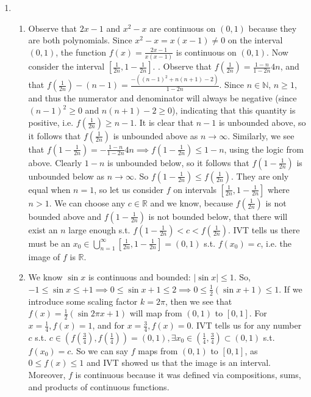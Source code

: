 \documentclass{article}
\begin{document}
\begin{enumerate}
    \item {}
    \begin{enumerate}
      \item Observe that $2x-1$ and $x^2 - x$ are continuous on $(0, 1)$ because
      they are both polynomials. Since $x^2 - x = x(x-1) \neq 0$
      on the interval $(0, 1)$, the function $f(x) = \frac{2x-1}{x(x-1)}$
      is continuous on $(0, 1)$.
      Now consider the interval $[\frac{1}{2n}, 1-\frac{1}{2n}]$.
      .
      Observe that $f(\frac{1}{2n}) = \frac{1 - n}{1-2n}4n$,
      and that $f(\frac{1}{2n}) - (n-1) = \frac{-((n-1)^2 + n(n+1) - 2)}{1-2n}$.
      Since $n\in\mathbb{N}$, $n\geq 1$, and thus the numerator 
      and denominator will always be negative (since $(n-1)^2 \geq 0$ and 
      $n(n+1) - 2 \geq 0$), indicating that this quantity is positive,
      i.e. $f(\frac{1}{2n}) \geq n-1$. It is clear that $n-1$
      is unbounded above, so it follows that $f(\frac{1}{2n})$ 
      is unbounded above as $n\to\infty$.
      Similarly,
      we see that $f(1-\frac{1}{2n}) = -\frac{1-n}{1-2n}4n
      \implies f(1-\frac{1}{2n}) \leq 1-n$, using 
      the logic from above. Clearly $1-n$ 
      is unbounded below,
      so it follows that $f(1-\frac{1}{2n})$
      is unbounded below as $n\to\infty$.
      So $f(1-\frac{1}{2n})\leq f(\frac{1}{2n})$.
      They are only equal when $n=1$,
      so let us consider $f$ on
      intervals $[\frac{1}{2n}, 1-\frac{1}{2n}]$
      where $n>1$.
      We can choose any $c\in\mathbb{R}$
      and we know, because 
      $f(\frac{1}{2n})$ is 
      not bounded above
      and $f(1-\frac{1}{2n})$
      is not bounded below,
      that there will exist an $n$ large enough
      s.t. $f(1-\frac{1}{2n}) < c < f(\frac{1}{2n})$.
      IVT tells us there must be an $x_0\in
      \bigcup\limits_{n=1}^{\infty} [\frac{1}{2n}, 1-\frac{1}{2n}] = (0, 1)$ 
      s.t. $f(x_0) = c$, i.e. the image of $f$ is $\mathbb{R}$.

      \item We know $\sin x$ is continuous and bounded: $|\sin x| \leq 1$.
      So, $-1 \leq \sin x \leq +1 \implies 0 \leq \sin x + 1 \leq 2
      \implies 0\leq \frac{1}{2}(\sin x + 1) \leq 1$.
      If we introduce some scaling factor $k=2\pi$,
      then we see that $f(x) = \frac{1}{2}(\sin 2\pi x + 1)$
      will map from $(0, 1)$ to $[0, 1]$.
      For $x = \frac{1}{4}, f(x)=1$,
      and for $x=\frac{3}{4}, f(x)=0$.
      IVT tells us for any number $c$
      s.t. $c\in (f(\frac{3}{4}), f(\frac{1}{4})) = (0, 1),
      \exists x_0\in (\frac{1}{4}, \frac{3}{4})\subset (0, 1)$
      s.t. $f(x_0)=c$.
      So we can say $f$ maps from $(0, 1)$
      to $[0, 1]$, as $0 \leq f(x) \leq 1$
      and IVT showed us that the image is an interval.
      Moreover, $f$ is continuous because
      it was defined via compositions,
      sums, and products of continuous functions.


\end{enumerate}
\end{enumerate}
\end{document}
